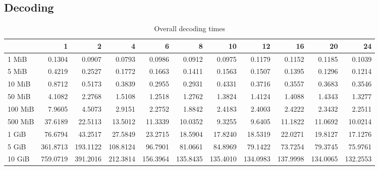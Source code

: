 \subsection{Decoding}
\begin{table}[!h]
	\caption{Overall decoding times}
\begin{tabular}{lrrrrrrrrrr}
	\toprule
	\diagbox{File sizes }{Threads} &        1  &        2  &        4  &        6  &        8  &        10 &        12 &        16 &        20 &        24 \\
	\midrule
	1 MiB   &    0.1304 &    0.0907 &    0.0793 &    0.0986 &    0.0912 &    0.0975 &    0.1179 &    0.1152 &    0.1185 &    0.1039 \\
	5 MiB   &    0.4219 &    0.2527 &    0.1772 &    0.1663 &    0.1411 &    0.1563 &    0.1507 &    0.1395 &    0.1296 &    0.1214 \\
	10 MiB  &    0.8712 &    0.5173 &    0.3839 &    0.2955 &    0.2931 &    0.4331 &    0.3716 &    0.3557 &    0.3683 &    0.3546 \\
	50 MiB  &    4.1082 &    2.2768 &    1.5108 &    1.2518 &    1.2762 &    1.3824 &    1.4124 &    1.4088 &    1.4343 &    1.3277 \\
	100 MiB &    7.9605 &    4.5073 &    2.9151 &    2.2752 &    1.8842 &    2.4183 &    2.4003 &    2.4222 &    2.3432 &    2.2511 \\
	500 MiB &   37.6189 &   22.5113 &   13.5012 &   11.3339 &   10.0352 &    9.3255 &    9.6405 &   11.1822 &   11.0692 &   10.0214 \\
	1 GiB   &   76.6794 &   43.2517 &   27.5849 &   23.2715 &   18.5904 &   17.8240 &   18.5319 &   22.0271 &   19.8127 &   17.1276 \\
	5 GiB   &  361.8713 &  193.1122 &  108.8124 &   96.7901 &   81.0661 &   84.8969 &   79.1422 &   73.7254 &   79.3745 &   75.9761 \\
	10 GiB  &  759.0719 &  391.2016 &  212.3814 &  156.3964 &  135.8435 &  135.4010 &  134.0983 &  137.9998 &  134.0065 &  132.2553 \\
	\bottomrule
\end{tabular}
\end{table}

